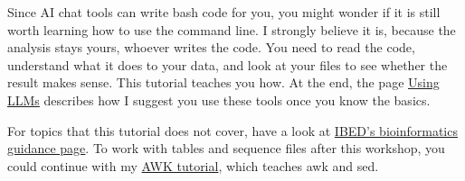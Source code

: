 \documentclass[
  letterpaper,
  DIV=11,
  numbers=noendperiod]{scrreprt}
\begin{document}
Since AI chat tools can write bash code for you, you might wonder if it
is still worth learning how to use the command line. I strongly believe
it is, because the analysis stays yours, whoever writes the code. You
need to read the code, understand what it does to your data, and look at
your files to see whether the result makes sense. This tutorial teaches
you how. At the end, the page \href{source/llm_usage.qmd}{Using LLMs}
describes how I suggest you use these tools once you know the basics.

For topics that this tutorial does not cover, have a look at
\href{https://scienceparkstudygroup.github.io/ibed-bioinformatics-page/}{IBED's
bioinformatics guidance page}. To work with tables and sequence files
after this workshop, you could continue with my
\href{https://ndombrowski.github.io/AWK_tutorial/}{AWK tutorial}, which
teaches awk and sed.
\end{document}
